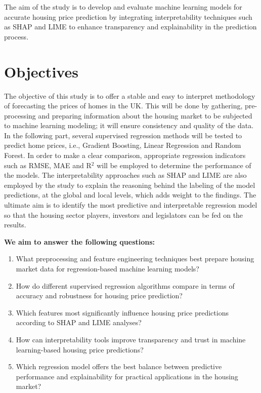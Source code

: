 \documentclass[12pt, a4paper, oneside]{book}
\begin{document}
The aim of the study is to develop and evaluate machine learning models for accurate housing price prediction by integrating interpretability techniques such as SHAP and LIME to enhance transparency and explainability in the prediction process.

\section{Objectives}

The objective of this study is to offer a stable and easy to interpret methodology of forecasting the prices of homes in the UK. This will be done by gathering, pre-processing and preparing information about the housing market to be subjected to machine learning modeling; it will ensure consistency and quality of the data. In the following part, several supervised regression methods will be tested to predict home prices, i.e., Gradient Boosting, Linear Regression and Random Forest. In order to make a clear comparison, appropriate regression indicators such as RMSE, MAE and R$^2$ will be employed to determine the performance of the models. The interpretability approaches such as SHAP and LIME are also employed by the study to explain the reasoning behind the labeling of the model predictions, at the global and local levels, which adds weight to the findings. The ultimate aim is to identify the most predictive and interpretable regression model so that the housing sector players, investors and legislators can be fed on the results.  

\textbf{}


\textbf{We aim to answer the following questions:}

\begin{enumerate}
\item What preprocessing and feature engineering techniques best prepare housing market data for regression-based machine learning models?
\item How do different supervised regression algorithms compare in terms of accuracy and robustness for housing price prediction?
\item Which features most significantly influence housing price predictions according to SHAP and LIME analyses?
\item How can interpretability tools improve transparency and trust in machine learning-based housing price predictions?
\item Which regression model offers the best balance between predictive performance and explainability for practical applications in the housing market?
\end{enumerate}
\end{document}
